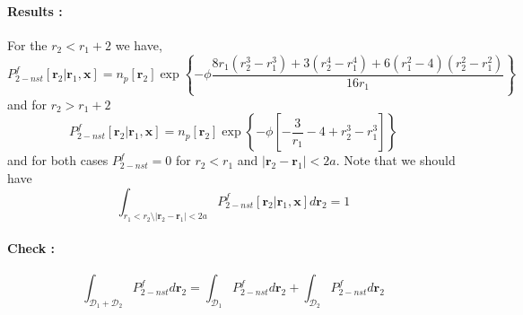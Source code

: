 \paragraph*{Results : }
For the $r_2 < r_1 + 2$ we have, 
\begin{equation}
    P_{2-nst}^f[\textbf{r}_2 | \textbf{r}_1,\textbf{x}]
    = 
    n_p[\textbf{r}_2]
    \exp\left\{-\phi 
        \frac{ 
        8 r_{1} \left(r_{2}^{3} - r_{1}^{3}\right) 
       + 3 (r_{2}^{4} - r_{1}^{4})
       + 6  \left(r_{1}^{2} - 4 \right) \left(r_{2}^{2} - r_{1}^{2}\right)}{16 r_{1}}
    \right\} 
\end{equation}
and for $r_2 > r_1 + 2$
\begin{equation}
    P_{2-nst}^f[\textbf{r}_2 | \textbf{r}_1,\textbf{x}]
    = 
    n_p[\textbf{r}_2]
    \exp\left\{-\phi 
    \left[
        -\frac{3}{r_1}
        - 4 
        + r_2^3
        -r_1^3
    \right]
    \right\} 
\end{equation}
and for both cases $P_{2-nst}^f = 0 $ for $r_2 < r_1$ and $|\textbf{r}_2-\textbf{r}_1|<2a$. 
Note that we should have 
\begin{equation}
    \int_{
        r_1 < r_2
        \setminus
        |\textbf{r}_2 - \textbf{r}_1| < 2a
    }
    P_{2-nst}^f[\textbf{r}_2 | \textbf{r}_1,\textbf{x}]
    d\textbf{r}_2 
    = 1 
\end{equation}


\paragraph*{Check : }

\begin{equation}
    \int_{
        \mathcal{D}_1 + \mathcal{D}_2
    }
    P_{2-nst}^f
    d\textbf{r}_2 
    = 
    \int_{
        \mathcal{D}_1 
    }
    P_{2-nst}^f
    d\textbf{r}_2 
    + 
    \int_{
        \mathcal{D}_2
    }
    P_{2-nst}^f
    d\textbf{r}_2 
\end{equation}


